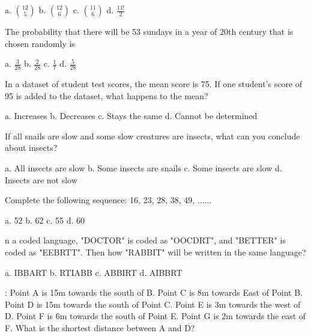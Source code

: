 \documentclass[a4paper, addpoints]{exam}
\begin{document}
\begin{questions}
	\begin{oneparcheckboxes}
		\choice a. \(\binom{12}{5}\)
		\choice b. \(\binom{12}{6}\)
		\choice c. \(\binom{11}{6}\)
		\choice d. \(\frac{11!}{2}\)
	\end{oneparcheckboxes}
	\question The probability that there will be 53 sundays in a year of 20th century that is chosen randomly is\\
	
	\begin{oneparcheckboxes}
		\choice a. \(\frac{3}{28}\)
		\choice b. \(\frac{2}{28}\)
		\choice c. \(\frac{1}{7}\)
		\choice d. \(\frac{5}{28}\)
	\end{oneparcheckboxes}
	\question In a dataset of student test scores, the mean score is 75. If one student's score of 95 is added to the dataset, what happens to the mean?\\
	
	\begin{oneparcheckboxes}
		\choice a. Increases
		\choice b. Decreases
		\choice c. Stays the same
		\choice d. Cannot be determined
	\end{oneparcheckboxes}
	\question If all snails are slow and some slow creatures are insects, what can you conclude about insects?\\
	
	\begin{oneparcheckboxes}
		\choice a. All insects are slow
		\choice b. Some insects are snails
		\choice c. Some insects are slow
		\choice d. Insects are not slow
	\end{oneparcheckboxes}
	\question Complete the following sequence: 16, 23, 28, 38, 49, ...... \\
	
	\begin{oneparcheckboxes}
		\choice a. 52
		\choice b. 62
		\choice c. 55
		\choice d. 60
	\end{oneparcheckboxes}
	\question n a coded language, "DOCTOR" is coded as "OOCDRT", and "BETTER" is coded as "EEBRTT". Then how "RABBIT" will be written in the same language?\\
	
	\begin{oneparcheckboxes}
		\choice a. IBBART
		\choice b. RTIABB
		\choice c. ABBIRT
		\choice d. AIBBRT
	\end{oneparcheckboxes}
	: Point A is 15m towards the south of B. Point C is 8m towards East of Point B. Point D is 15m towards the south of Point C. Point E is 3m towards the west of D. Point F is 6m towards the south of Point E. Point G is 2m towards the east of F. What is the shortest distance between A and D?\\
	

\end{questions}
\end{document}
